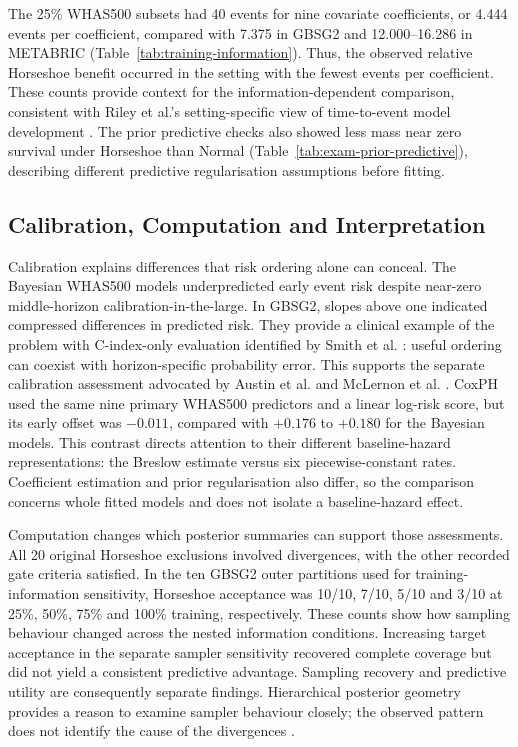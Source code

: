 The 25\% WHAS500 subsets had 40 events for nine covariate coefficients, or 4.444 events per coefficient, compared with 7.375 in GBSG2 and 12.000--16.286 in METABRIC (Table~\ref{tab:training-information}). Thus, the observed relative Horseshoe benefit occurred in the setting with the fewest events per coefficient. These counts provide context for the information-dependent comparison, consistent with Riley et al.'s setting-specific view of time-to-event model development \cite{riley2019samplesize}. The prior predictive checks also showed less mass near zero survival under Horseshoe than Normal (Table~\ref{tab:exam-prior-predictive}), describing different predictive regularisation assumptions before fitting.

\subsection{Calibration, Computation and Interpretation}\label{why-might-performance-differ}

Calibration explains differences that risk ordering alone can conceal. The Bayesian WHAS500 models underpredicted early event risk despite near-zero middle-horizon calibration-in-the-large. In GBSG2, slopes above one indicated compressed differences in predicted risk. They provide a clinical example of the problem with C-index-only evaluation identified by Smith et al. \cite{ref44}: useful ordering can coexist with horizon-specific probability error. This supports the separate calibration assessment advocated by Austin et al. \cite{ref59} and McLernon et al. \cite{ref84}. CoxPH used the same nine primary WHAS500 predictors and a linear log-risk score, but its early offset was $-0.011$, compared with $+0.176$ to $+0.180$ for the Bayesian models. This contrast directs attention to their different baseline-hazard representations: the Breslow estimate versus six piecewise-constant rates. Coefficient estimation and prior regularisation also differ, so the comparison concerns whole fitted models and does not isolate a baseline-hazard effect.

Computation changes which posterior summaries can support those assessments. All 20 original Horseshoe exclusions involved divergences, with the other recorded gate criteria satisfied. In the ten GBSG2 outer partitions used for training-information sensitivity, Horseshoe acceptance was 10/10, 7/10, 5/10 and 3/10 at 25\%, 50\%, 75\% and 100\% training, respectively. These counts show how sampling behaviour changed across the nested information conditions. Increasing target acceptance in the separate sampler sensitivity recovered complete coverage but did not yield a consistent predictive advantage. Sampling recovery and predictive utility are consequently separate findings. Hierarchical posterior geometry provides a reason to examine sampler behaviour closely; the observed pattern does not identify the cause of the divergences \cite{ref39,ref53}.

